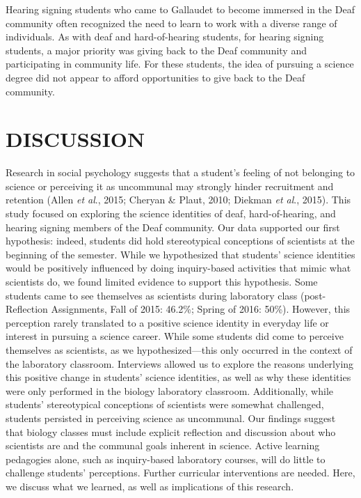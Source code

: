 \documentclass[11.5pt]{sig-alternate} %
\begin{document}
\begin{large}
Hearing signing students who came to Gallaudet to become immersed in the Deaf community often recognized the need to learn to work with a diverse range of individuals. As with deaf and hard-of-hearing students, for hearing signing students, a major priority was giving back to the Deaf community and participating in community life. For these students, the idea of pursuing a science degree did not appear to afford opportunities to give back to the Deaf community. 

\section*{DISCUSSION}

Research in social psychology suggests that a student’s feeling of not belonging to science or perceiving it as uncommunal may strongly hinder recruitment and retention (Allen \textit{et al}., 2015; Cheryan \& Plaut, 2010; Diekman \textit{et al}., 2015). This study focused on exploring the science identities of deaf, hard-of-hearing, and hearing signing members of the Deaf community. Our data supported our first hypothesis: indeed, students did hold stereotypical conceptions of scientists at the beginning of the semester. While we hypothesized that students’ science identities would be positively influenced by doing inquiry-based activities that mimic what scientists do, we found limited evidence to support this hypothesis. Some students came to see themselves as scientists during laboratory class (post-Reflection Assignments, Fall of 2015: 46.2\%; Spring of 2016: 50\%). However, this perception rarely translated to a positive science identity in everyday life or interest in pursuing a science career. While some students did come to perceive themselves as scientists, as we hypothesized—this only occurred in the context of the laboratory classroom. Interviews allowed us to explore the reasons underlying this positive change in students’ science identities, as well as why these identities were only performed in the biology laboratory classroom. Additionally, while students’ stereotypical conceptions of scientists were somewhat challenged, students persisted in perceiving science as uncommunal. Our findings suggest that biology classes must include explicit reflection and discussion about who scientists are and the communal goals inherent in science. Active learning pedagogies alone, such as inquiry-based laboratory courses, will do little to challenge students’ perceptions. Further curricular interventions are needed. Here, we discuss what we learned, as well as implications of this research.


\end{large}
\end{document}
